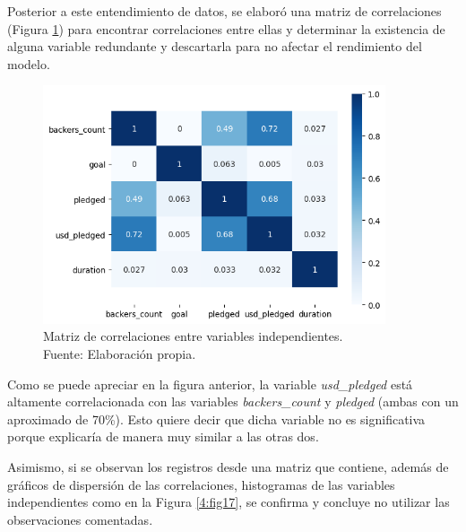 \newpage
Posterior a este entendimiento de datos, se elaboró una matriz de correlaciones (Figura \ref{4:fig16}) para encontrar correlaciones entre ellas y determinar la existencia de alguna variable redundante y descartarla para no afectar el rendimiento del modelo.

\begin{figure}[!ht]
	\begin{center}
		\includegraphics[width=0.90\textwidth]{4/figures/metadata correlation.png}
		\caption[Matriz de correlaciones entre variables independientes]{Matriz de correlaciones entre variables independientes.\\
			Fuente: Elaboración propia.}
		\label{4:fig16}
	\end{center}
\end{figure}

Como se puede apreciar en la figura anterior, la variable \textit{usd\_pledged} está altamente correlacionada con las variables \textit{backers\_count} y \textit{pledged} (ambas con un aproximado de 70\%). Esto quiere decir que dicha variable no es significativa porque explicaría de manera muy similar a las otras dos.

\newpage
Asimismo, si se observan los registros desde una matriz que contiene, además de gráficos de dispersión de las correlaciones, histogramas de las variables independientes como en la Figura \ref{4:fig17}, se confirma y concluye no utilizar las observaciones comentadas.

